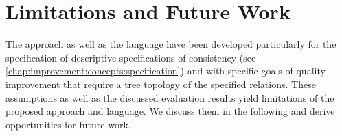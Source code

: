 

\section{Limitations and Future Work}

The \commonalities approach as well as the \commonalities language have been developed particularly for the specification of descriptive specifications of consistency (see \autoref{chap:improvement:concepts:specification}) and with specific goals of quality improvement that require a tree topology of the specified relations.
These assumptions as well as the discussed evaluation results yield limitations of the proposed approach and language.
We discuss them in the following and derive opportunities for future work.

